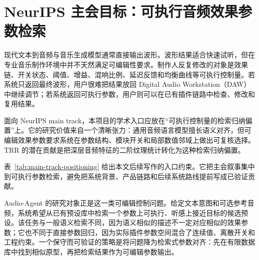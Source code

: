 \chapter{NeurIPS 主会目标：可执行音频效果参数检索}

现代文本到音频与音乐生成模型通常直接输出波形。波形结果适合快速试听，但在专业音乐制作环境中并不天然满足可编辑性要求。制作人反复修改的对象是效果链、开关状态、阈值、增益、混响比例、延迟反馈和均衡曲线等可执行控制量。若系统只返回最终波形，用户很难把结果放回 Digital Audio Workstation（DAW）中继续调节；若系统返回可执行参数，用户则可以在已有插件链路中检查、修改和复用结果。

面向 NeurIPS main track，本项目的学术入口应放在“可执行控制量的检索归纳偏置”上。它的研究价值来自一个清晰张力：通用音频语言模型擅长语义对齐，但可编辑效果参数要求系统在参数结构、模块开关和局部数值邻域上做出可复核选择。TRR 的潜在贡献是把深层音频特征的二阶纹理统计转化为这种检索归纳偏置。

\begin{table}[H]
	\centering
	\caption{NeurIPS main-track 定位边界。}
	\label{tab:main-track-positioning}
	\small
\end{table}

表~\ref{tab:main-track-positioning} 给出本文后续写作的入口约束。它把主会叙事集中到可执行参数检索，避免把系统背景、产品链路和后续系统路线提前写成已验证贡献。

Audio-Agent 的研究对象正是这一类可编辑控制问题。给定文本意图和可选参考音频，系统希望从已有预设库中检索一个参数上可执行、听感上接近目标的候选预设。该任务与一般语义检索不同，因为语义相似的描述不一定对应相似的效果参数；它也不同于直接参数回归，因为实际插件参数空间混合了连续值、离散开关和工程约束。一个保守而可验证的策略是将问题降为检索式参数对齐：先在有限数据库中找到相似原型，再把检索结果作为可编辑参数输出。

